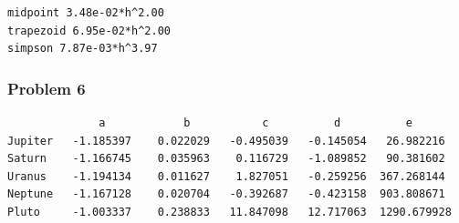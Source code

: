 \documentclass[11pt,fleqn]{exam}
\begin{document}
\noindent
\begin{lstlisting}
midpoint 3.48e-02*h^2.00
trapezoid 6.95e-02*h^2.00
simpson 7.87e-03*h^3.97
\end{lstlisting}


\subsubsection*{Problem 6}
\begin{lstlisting}
              a            b           c          d          e
Jupiter   -1.185397    0.022029   -0.495039   -0.145054   26.982216
Saturn    -1.166745    0.035963    0.116729   -1.089852   90.381602
Uranus    -1.194134    0.011627    1.827051   -0.259256  367.268144
Neptune   -1.167128    0.020704   -0.392687   -0.423158  903.808671
Pluto     -1.003337    0.238833   11.847098   12.717063  1290.679928
\end{lstlisting}
\end{document}
